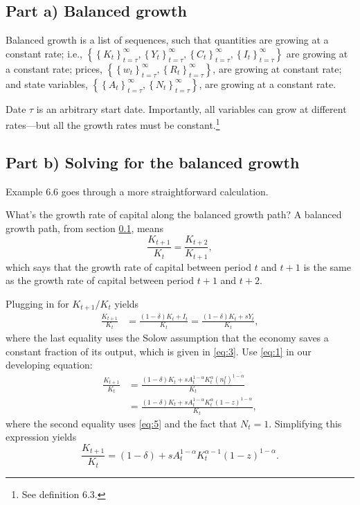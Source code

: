 \documentclass[12pt]{pracjourn_rwr}
\theoremstyle{definition}
\theoremstyle{remark}
\begin{document}
\subsection{Part a) Balanced growth}
\label{sec:part-a}

Balanced growth is a list of sequences,
such that quantities are growing at a constant rate; i.e.,
$\left\{
\left\{ K_{t} \right\}_{t=\tau}^{\infty},
\left\{ Y_{t} \right\}_{t=\tau}^{\infty},
\left\{ C_{t} \right\}_{t=\tau}^{\infty},
\left\{ I_{t} \right\}_{t=\tau}^{\infty} \right\}$
are growing at a constant rate;
prices,
$\left\{ \left\{ w_{t} \right\}_{t=\tau}^{\infty}, \left\{ R_{t} \right\}_{t=\tau}^{\infty} \right\}$,
are growing at constant rate; and
state variables,
$\left\{ \left\{ A_{t} \right\}_{t=\tau}^{\infty},
\left\{ N_{t} \right\}_{t=\tau}^{\infty} \right\}$,
are growing at a constant rate.

Date $\tau$ is an arbitrary start date.
Importantly, all variables can grow at different rates---but all the growth rates must be constant.\footnote{See definition 6.3.}

\subsection{Part b) Solving for the balanced growth}

Example 6.6 goes through a more straightforward calculation.

What's the growth rate of capital along the balanced growth path?
A balanced growth path, from section \ref{sec:part-a}, means
\begin{equation}
\label{eq:8}
\frac{K_{t+1}}{K_{t}} = \frac{K_{t+2}}{K_{t+1}},
\end{equation}
which says that the growth rate of capital between period $t$ and $t+1$ is the same as
the growth rate of capital between period $t+1$ and $t+2$.

Plugging in for $K_{t+1} / K_{t}$ yields
\begin{align*}
\frac{K_{t+1}}{K_{t}} &= \frac{(1-\delta)K_{t} + I_{t}}{K_{t}} = \frac{(1-\delta)K_{t} + sY_{t}}{K_{t}},
\end{align*}
where the last equality uses the Solow assumption that the economy saves a constant fraction of its output,
which is given in \eqref{eq:3}.
Use \eqref{eq:1} in our developing equation:
\begin{align*}
\frac{K_{t+1}}{K_{t}} &=
\frac{(1-\delta)K_{t} + sA_{t}^{1-\alpha}K_{t}^{\alpha} \left( n_{t}^{f} \right)^{1-\alpha}}{K_{t}} \\
&=
\frac{(1-\delta)K_{t} + sA_{t}^{1-\alpha}K_{t}^{\alpha} \left( 1-z \right)^{1-\alpha}}{K_{t}},
\end{align*}
where the second equality uses \eqref{eq:5} and the fact that $N_{t} = 1$.
Simplifying this expression yields
\begin{equation}
\label{eq:9}
\frac{K_{t+1}}{K_{t}} =
(1-\delta) + sA_{t}^{1-\alpha}K_{t}^{\alpha-1} \left( 1-z \right)^{1-\alpha}.
\end{equation}
\end{document}
